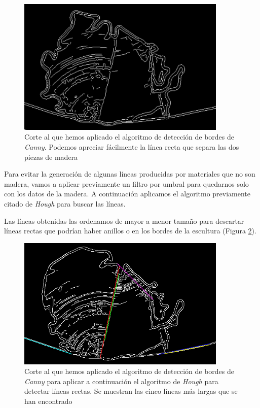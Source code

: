 \begin{figure}[H]
	\centering
	\includegraphics[width=10cm]{imagenes/desarrollo/canny}
	\caption{Corte al que hemos aplicado el algoritmo de detección de bordes de \textit{Canny}. Podemos apreciar fácilmente la línea recta que separa las dos piezas de madera}
	\label{fig:desarrollo/canny}
\end{figure}

Para evitar la generación de algunas líneas producidas por materiales que no son madera, vamos a aplicar previamente un filtro por umbral para quedarnos solo con los datos de la madera. A continuación aplicamos el algoritmo previamente citado de \textit{Hough} para buscar las líneas. 

Las líneas obtenidas las ordenamos de mayor a menor tamaño para descartar líneas rectas que podrían haber anillos o en los bordes de la escultura (Figura \ref{fig:desarrollo/canny-hough}).

\begin{figure}[H]
	\centering
	\includegraphics[width=10cm]{imagenes/desarrollo/canny-hough}
	\caption{Corte al que hemos aplicado el algoritmo de detección de bordes de \textit{Canny} para aplicar a continuación el algoritmo de \textit{Hough} para detectar líneas rectas. Se muestran las cinco líneas más largas que se han encontrado}
	\label{fig:desarrollo/canny-hough}
\end{figure}


